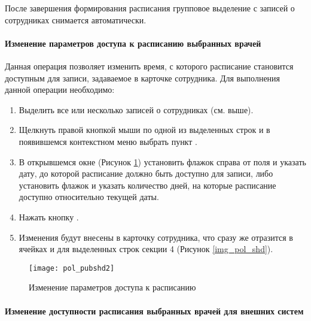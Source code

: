 \begin{vnim}
 После завершения формирования расписания групповое выделение с записей о сотрудниках снимается автоматически.
\end{vnim}

\paragraph{Изменение параметров доступа к расписанию выбранных врачей}

Данная операция позволяет изменить время, с которого расписание становится доступным для записи, задаваемое в карточке сотрудника. Для выполнения данной операции необходимо:
\begin{enumerate}
 \item Выделить все или несколько записей о сотрудниках (см. выше).
 \item Щелкнуть правой кнопкой мыши по одной из выделенных строк и в появившемся контекстном меню выбрать пункт .
 \item В открывшемся окне (Рисунок \ref{img_pol_pubshd2}) установить флажок справа от поля  и указать дату, до которой расписание должно быть доступно для записи, либо установить флажок  и указать количество дней, на которые расписание доступно относительно текущей даты.
 \item Нажать кнопку .
 \item Изменения будут внесены в карточку сотрудника, что сразу же отразится в ячейках  и  для выделенных строк секции 4 (Рисунок \ref{img_pol_shd}).
\end{enumerate}

\begin{figure}[ht]\centering
 \texttt{[image: pol\_pubshd2]}
 \caption{Изменение параметров доступа к расписанию}
 \label{img_pol_pubshd2}
\end{figure}  
 
\paragraph{Изменение доступности расписания выбранных врачей для внешних систем}

